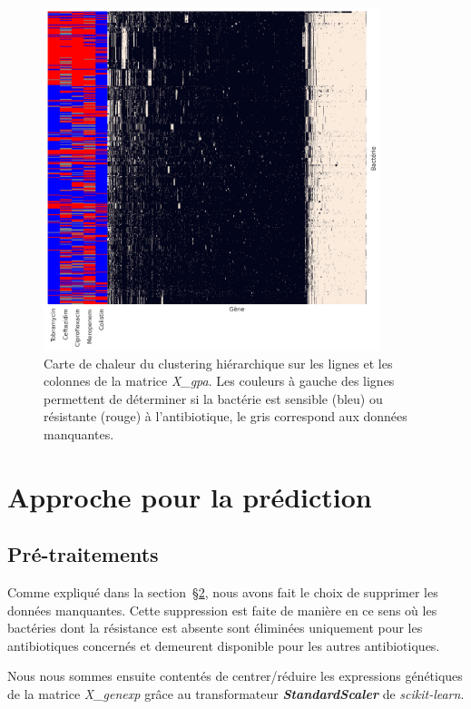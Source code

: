 \documentclass[11pt]{article}
\begin{document}
  \begin{figure}[H]
    \centering
    \includegraphics[height=10cm,width=\textwidth,keepaspectratio]{gpa_cm}
    \caption{Carte de chaleur du clustering hiérarchique sur les lignes et les colonnes de la matrice \textit{X\_gpa}.
    Les couleurs à gauche des lignes permettent de déterminer si la bactérie est sensible (bleu) ou résistante (rouge) à l'antibiotique, le gris correspond aux données manquantes.}
    \label{fig:gpa_cm}
  \end{figure}

\hypertarget{approche-prediction}{%
\section{Approche pour la prédiction}\label{approche-prediction}}

\hypertarget{pre-traitements}{%
\subsection{Pré-traitements}\label{pre-traitements}}

  Comme expliqué dans la section~\hyperref[exploration-donnees]{\S2}, nous avons fait le choix de supprimer les données manquantes.
  Cette suppression est faite de manière  en ce sens où les bactéries dont la résistance est absente sont éliminées uniquement pour les antibiotiques concernés et demeurent disponible pour les autres antibiotiques.

  Nous nous sommes ensuite contentés de centrer/réduire les expressions génétiques de la matrice \textit{X\_genexp} grâce au transformateur \textit{\textbf{StandardScaler}} de \textit{scikit-learn}.
\end{document}
